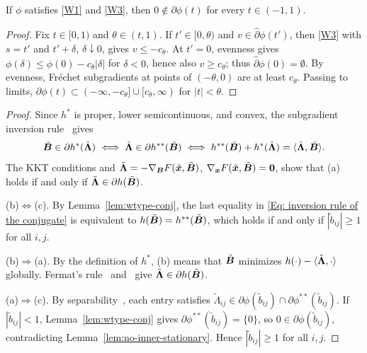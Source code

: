 \subsection{}
\label{app:transfer-proof}
\begingroup\color{blue}
\begin{lemma}\label{lem:no-inner-stationary}
If \(\phi\) satisfies \ref{W1} and \ref{W3}, then \(0\notin\partial\phi(t)\) for every \(t\in(-1,1)\).
\end{lemma}
\begin{proof}
Fix \(t\in[0,1)\) and \(\theta\in(t,1)\). If \(t'\in[0,\theta)\) and \(v\in\hat\partial\phi(t')\), then \ref{W3} with \(s=t'\) and \(t'+\delta\), \(\delta\downarrow0\), gives \(v\le-c_{\theta}\). At \(t'=0\), evenness gives \(\phi(\delta)\le\phi(0)-c_{\theta}|\delta|\) for \(\delta<0\), hence also \(v\ge c_{\theta}\); thus \(\hat\partial\phi(0)=\emptyset\). By evenness, Fr\'echet subgradients at points of \((-\theta,0)\) are at least \(c_{\theta}\). Passing to limits, \(\partial\phi(t)\subset(-\infty,-c_{\theta}]\cup[c_{\theta},\infty)\) for \(|t|<\theta\).
\end{proof}

\begin{proof}
    Since \(h^{*}\) is proper, lower semicontinuous, and convex, the subgradient inversion rule~\cite[Theorem~23.5]{rockafellar1970convex} gives
    \begin{align}
        \label{Eq: inversion rule of the conjugate}
        \tilde{\bB}\in\partial h^{*}(\tilde{\bLmbd})
        \iff \tilde{\bLmbd}\in\partial h^{**}(\tilde{\bB})
        \iff h^{**}(\tilde{\bB})+h^{*}(\tilde{\bLmbd})=\langle\tilde{\bLmbd},\tilde{\bB}\rangle.
    \end{align}
    The KKT conditions and \(\tilde{\bm{\Lambda}}=-\nabla_{\bm{B}}F(\tilde{\bm{x}},\tilde{\bm{B}})\), \(\nabla_{\bm{x}}F(\tilde{\bm{x}},\tilde{\bm{B}})=\bm{0}\), show that (a) holds if and only if \(\tilde{\bm{\Lambda}}\in\partial h(\tilde{\bm{B}})\).

    (b)$\iff$(c). By Lemma~\ref{lem:wtype-conj}, the last equality in \eqref{Eq: inversion rule of the conjugate} is equivalent to \(h(\tilde{\bm{B}})=h^{**}(\tilde{\bm{B}})\), which holds if and only if \(|\tilde b_{ij}|\ge1\) for all \(i,j\).

    (b)$\Rightarrow$(a). By the definition of \(h^{*}\), (b) means that \(\tilde{\bm{B}}\) minimizes \(h(\cdot)-\langle\tilde{\bm{\Lambda}},\cdot\rangle\) globally. Fermat's rule~\cite[Theorem~10.1]{Rockafellar1998VariationalA} and~\cite[Exercise~8.8(c)]{Rockafellar1998VariationalA} give \(\tilde{\bm{\Lambda}}\in\partial h(\tilde{\bm{B}})\).

    (a)$\Rightarrow$(c). By separability~\cite[Proposition~10.5]{Rockafellar1998VariationalA}, each entry satisfies \(\tilde\Lambda_{ij}\in\partial\phi(\tilde b_{ij})\cap\partial\phi^{**}(\tilde b_{ij})\). If \(|\tilde b_{ij}|<1\), Lemma~\ref{lem:wtype-conj} gives \(\partial\phi^{**}(\tilde b_{ij})=\{0\}\), so \(0\in\partial\phi(\tilde b_{ij})\), contradicting Lemma~\ref{lem:no-inner-stationary}. Hence \(|\tilde b_{ij}|\ge1\) for all \(i,j\).
\end{proof}
\endgroup

